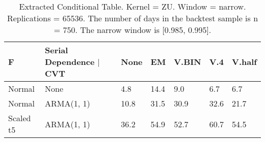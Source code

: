 \begin{table}[ht]
\centering
\begin{tabular}{lllllll}
  \toprule
F & Serial Dependence $|$ CVT & None & EM & V.BIN & V.4 & V.half \\ 
  \midrule
Normal &             None &  4.8 & 14.4 &  9.0 &  6.7 &  6.7 \\ 
  Normal & ARMA(1, 1) & 10.8 & 31.5 & 30.9 & 32.6 & 21.7 \\ 
  Scaled t5 & ARMA(1, 1) & 36.2 & 54.9 & 52.7 & 60.7 & 54.5 \\ 
   \bottomrule
\end{tabular}
\caption{Extracted Conditional Table. Kernel = ZU. Window = narrow. Replications = 65536. The number of days in the backtest sample is n = 750. The narrow window is [0.985, 0.995].} 
\label{table:extracted_table}
\end{table}
